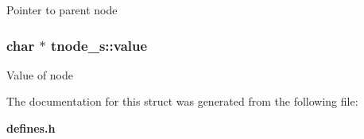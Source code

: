 Pointer to parent node 
\subsubsection{\setlength{\rightskip}{0pt plus 5cm}char $\ast$ tnode\_\-s::value}\label{structtnode__s_m1}


Value of node 

The documentation for this struct was generated from the following file:\begin{CompactItemize}
\item 
{\bf defines.h}\end{CompactItemize}
